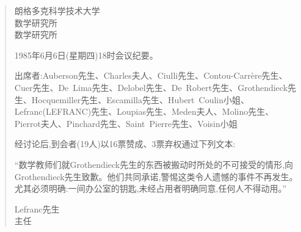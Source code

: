 \begin{quote}
朗格多克科学技术大学\\
数学研究所\\
\pmark{}数学研究所

1985年6月6日(星期四)18时会议纪要。

出席者:Auberson先生、Charles夫人、Ciulli先生、Contou-Carrère先生、Cuer先生、De~Lima先生、Delobel先生、De~Robert先生、Grothendieck先生、Hocquemiller先生、Escamilla先生、Hubert~Coulin小姐、Lefranc(LEFRANC)先生、Loupias先生、Meden夫人、Molino先生、Pierrot夫人、Pinchard先生、Saint~Pierre先生、Voisin小姐

经讨论后,到会者(19人)以16票赞成、3票弃权通过下列文本:

“数学教师们就Grothendieck先生的东西被搬动时所处的不可接受的情形,向Grothendieck先生致歉。他们共同承诺,警惕这类令人遗憾的事件不再发生。尤其必须明确:一间办公室的钥匙,未经占用者明确同意,任何人不得动用。”

\begin{center}
Lefranc先生\\
主任
\end{center}
\end{quote}

